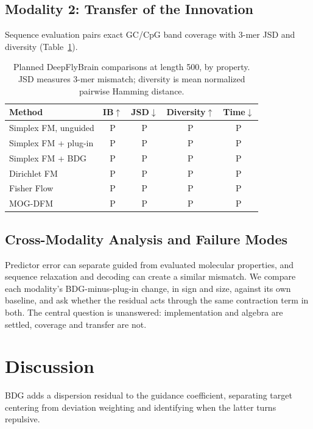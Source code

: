 \documentclass{article}
\newcommand{\pend}{\textcolor{black!60}{\textsf{P}}}
\begin{document}
\subsection{Modality 2: Transfer of the Innovation}\label{sec:m2}
Sequence evaluation pairs exact GC/CpG band coverage with 3-mer JSD and diversity (Table~\ref{tab:m2}).

\begin{table}[!htbp]
\centering\small
\caption{Planned DeepFlyBrain comparisons at length 500, by property. JSD measures 3-mer mismatch; diversity is mean normalized pairwise Hamming distance.}
\label{tab:m2}
\begin{tabular}{lcccc}
\toprule
Method & IB$\uparrow$ & JSD$\downarrow$ & Diversity$\uparrow$ & Time$\downarrow$\\
\midrule
Simplex FM, unguided & \pend & \pend & \pend & \pend\\
Simplex FM + plug-in & \pend & \pend & \pend & \pend\\
Simplex FM + BDG & \pend & \pend & \pend & \pend\\
Dirichlet FM \citep{stark2024dirichlet} & \pend & \pend & \pend & \pend\\
Fisher Flow \citep{davis2024fisher} & \pend & \pend & \pend & \pend\\
MOG-DFM \citep{chen2025multi} & \pend & \pend & \pend & \pend\\
\bottomrule
\end{tabular}
\end{table}


\subsection{Cross-Modality Analysis and Failure Modes}\label{sec:failure}
Predictor error can separate guided from evaluated molecular properties, and sequence relaxation and decoding can create a similar mismatch. We compare each modality's BDG-minus-plug-in change, in sign and size, against its own baseline, and ask whether the residual acts through the same contraction term in both. The central question is unanswered: implementation and algebra are settled, coverage and transfer are not.

\section{Discussion}
BDG adds a dispersion residual to the guidance coefficient, separating target centering from deviation weighting and identifying when the latter turns repulsive.
\end{document}
